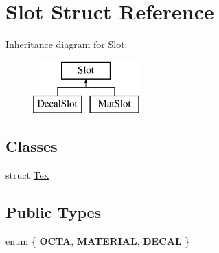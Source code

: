 \hypertarget{struct_slot}{}\section{Slot Struct Reference}
\label{struct_slot}
Inheritance diagram for Slot\+:\begin{figure}[H]
\begin{center}
\leavevmode
\includegraphics[height=2.000000cm]{struct_slot}
\end{center}
\end{figure}
\subsection*{Classes}
\begin{DoxyCompactItemize}
\item 
struct \hyperlink{struct_slot_1_1_tex}{Tex}
\end{DoxyCompactItemize}
\subsection*{Public Types}
\begin{DoxyCompactItemize}
\item 
\mbox{\label{struct_slot_a3e65397b85f70651e0eeba7d6e21de46}} 
enum \{ {\bfseries O\+C\+TA}, 
{\bfseries M\+A\+T\+E\+R\+I\+AL}, 
{\bfseries D\+E\+C\+AL}
 \}
\end{DoxyCompactItemize}
